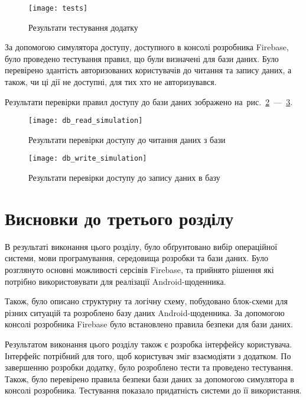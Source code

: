 \documentclass[../main.tex]{subfiles}
\begin{document}
\begin{figure}[H]
	\centering
	\texttt{[image: tests]}
	\caption{Результати тестування додатку}
	\label{figure:test_results}
\end{figure}

За допомогою симулятора доступу, доступного в консолі розробника Firebase, було проведено тестування правил, що були визначені для бази даних. Було перевірено здантість авторизованих користувачів до читання та запису даних, а також, чи ці дії не доступні, для тих хто не авторизувався. 

Результати перевірки правил доступу до бази даних зображено на~рис.~\ref{figure:db_read_simulation}~—~\ref{figure:db_write_simulation}.

\begin{figure}[H]
	\centering
	\texttt{[image: db\_read\_simulation]}
	\caption{Результати перевірки доступу до читання даних з бази}
	\label{figure:db_read_simulation}
\end{figure}

\begin{figure}[H]
	\centering
	\texttt{[image: db\_write\_simulation]}
	\caption{Результати перевірки доступу до запису даних в базу}
	\label{figure:db_write_simulation}
\end{figure}

\section{Висновки до третього розділу}

В результаті виконання цього розділу, було обґрунтовано вибір операційної системи, мови програмування, середовища розробки та бази даних. Було розглянуто основні можливості серсівів Firebase, та прийнято рішення які потрібно використовувати для реалізації Android-щоденника.

Також, було описано структурну та логічну схему, побудовано блок-схеми для різних ситуацій та розроблено базу даних Android-щоденника. За допомогою консолі розробника Firebase було встановлено правила безпеки для бази даних. 

Результатом виконання цього розділу також є розробка інтерфейсу користувача. Інтерфейс потрібний для того, щоб користувач зміг взаємодіяти з додатком. По завершенню розробки додатку, було розроблено тести та проведено тестування. Також, було перевірено правила безпеки бази даних за допомогою симулятора в консолі розробника. Тестування показало придатність системи до її використання.
	
\end{document}
